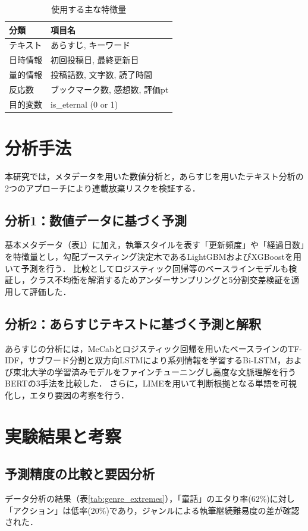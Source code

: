 \documentclass[twocolumn,10pt,a4paper]{jsarticle}
\begin{document}
\begin{table}[H]
  \centering
  \caption{使用する主な特徴量}
  \label{tab:dataset_columns}
  \small
  \begin{tabular}{l|l} \hline
    分類 & 項目名 \\ \hline
    テキスト & あらすじ, キーワード \\
    日時情報 & 初回投稿日, 最終更新日 \\
    量的情報 & 投稿話数, 文字数, 読了時間 \\
    反応数 & ブックマーク数, 感想数, 評価pt \\
    目的変数 & is\_eternal (0 or 1) \\ \hline
  \end{tabular}
\end{table}

\section{分析手法}
本研究では，メタデータを用いた数値分析と，あらすじを用いたテキスト分析の2つのアプローチにより連載放棄リスクを検証する．

\subsection{分析1：数値データに基づく予測}
基本メタデータ（表\ref{tab:dataset_columns}）に加え，執筆スタイルを表す「更新頻度」や「経過日数」を特徴量とし，勾配ブースティング決定木であるLightGBMおよびXGBoostを用いて予測を行う．
比較としてロジスティック回帰等のベースラインモデルも検証し，クラス不均衡を解消するためアンダーサンプリングと5分割交差検証を適用して評価した．

\subsection{分析2：あらすじテキストに基づく予測と解釈}
あらすじの分析には，MeCabとロジスティック回帰を用いたベースラインのTF-IDF，サブワード分割と双方向LSTMにより系列情報を学習するBi-LSTM，および東北大学の学習済みモデルをファインチューニングし高度な文脈理解を行うBERTの3手法を比較した．
さらに，LIMEを用いて判断根拠となる単語を可視化し，エタり要因の考察を行う．

\section{実験結果と考察}

\subsection{予測精度の比較と要因分析}
データ分析の結果（表\ref{tab:genre_extremes}），「童話」のエタり率(62\%)に対し「アクション」は低率(20\%)であり，ジャンルによる執筆継続難易度の差が確認された．
\end{document}
